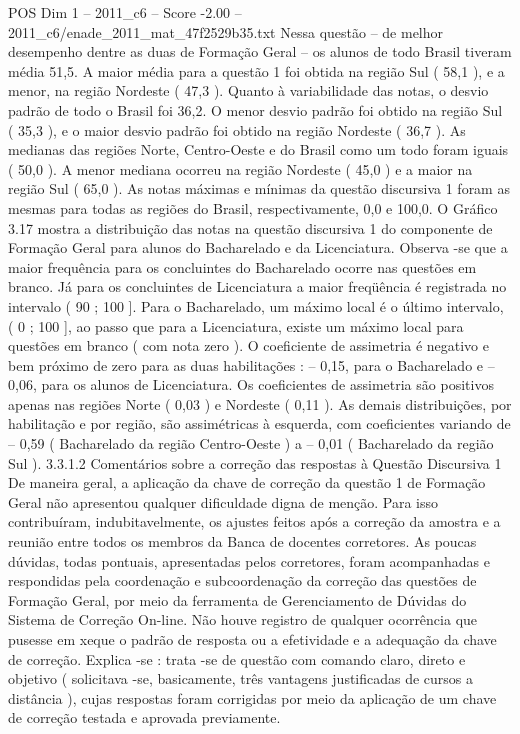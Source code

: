 \begin{textsample}{POS Dim 1 – 2011\_c6 – Score -2.00 – 2011\_c6/enade\_2011\_mat\_47f2529b35.txt}
Nessa questão – de melhor desempenho dentre as duas de Formação Geral – os alunos de todo Brasil tiveram média 51,5.
A maior média para a questão 1 foi obtida na região Sul ( 58,1 ), e a menor, na região Nordeste ( 47,3 ).
Quanto à variabilidade das notas, o desvio padrão de todo o Brasil foi 36,2.
O menor desvio padrão foi obtido na região Sul ( 35,3 ), e o maior desvio padrão foi obtido na região Nordeste ( 36,7 ).
As medianas das regiões Norte, Centro-Oeste e do Brasil como um todo foram iguais ( 50,0 ).
A menor mediana ocorreu na região Nordeste ( 45,0 ) e a maior na região Sul ( 65,0 ).
As notas máximas e mínimas da questão discursiva 1 foram as mesmas para todas as regiões do Brasil, respectivamente, 0,0 e 100,0.
O Gráfico 3.17 mostra a distribuição das notas na questão discursiva 1 do componente de Formação Geral para alunos do Bacharelado e da Licenciatura.
Observa -se que a maior frequência para os concluintes do Bacharelado ocorre nas questões em branco.
Já para os concluintes de Licenciatura a maior freqüência é registrada no intervalo ( 90 ; 100 ].
Para o Bacharelado, um máximo local é o último intervalo, ( 0 ; 100 ], ao passo que para a Licenciatura, existe um máximo local para questões em branco ( com nota zero ).
O coeficiente de assimetria é negativo e bem próximo de zero para as duas habilitações : – 0,15, para o Bacharelado e – 0,06, para os alunos de Licenciatura.
Os coeficientes de assimetria são positivos apenas nas regiões Norte ( 0,03 ) e Nordeste ( 0,11 ).
As demais distribuições, por habilitação e por região, são assimétricas à esquerda, com coeficientes variando de – 0,59 ( Bacharelado da região Centro-Oeste ) a – 0,01 ( Bacharelado da região Sul ). 3.3.1.2 Comentários sobre a correção das respostas à Questão Discursiva 1 De maneira geral, a aplicação da chave de correção da questão 1 de Formação Geral não apresentou qualquer dificuldade digna de menção.
Para isso contribuíram, indubitavelmente, os ajustes feitos após a correção da amostra e a reunião entre todos os membros da Banca de docentes corretores.
As poucas dúvidas, todas pontuais, apresentadas pelos corretores, foram acompanhadas e respondidas pela coordenação e subcoordenação da correção das questões de Formação Geral, por meio da ferramenta de Gerenciamento de Dúvidas do Sistema de Correção On-line.
Não houve registro de qualquer ocorrência que pusesse em xeque o padrão de resposta ou a efetividade e a adequação da chave de correção.
Explica -se : trata -se de questão com comando claro, direto e objetivo ( solicitava -se, basicamente, três vantagens justificadas de cursos a distância ), cujas respostas foram corrigidas por meio da aplicação de um chave de correção testada e aprovada previamente.

\end{textsample}
